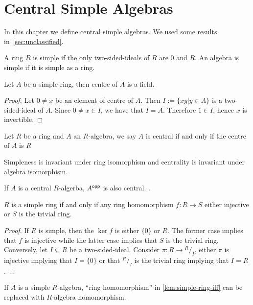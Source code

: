 \chapter{Central Simple Algebras}\label{sec:csa}

In this chapter we define central simple algebras. We used some results
in~\cref{sec:unclassified}.

\begin{definition} A ring $R$ is simple if the only
  two-sided-ideals of $R$ are ${0}$ and $R$. An algebra is simple if it is
  simple as a ring. \leanok {}
\end{definition}

\begin{lemma}
  \label{lem:center-simple-ring}
  Let $A$ be a simple ring, then centre of $A$ is a field. \leanok
\end{lemma}
\begin{proof}
  Let $0\ne x$ be an element of centre of $A$. Then $I := \{xy | y\in A\}$ is a
  two-sided-ideal of $A$. Since $0\ne x\in I$, we have that $I = A$. Therefore
  $1 \in I$, hence $x$ is invertible.
\end{proof}

\begin{definition}
  Let $R$ be a ring and $A$ an $R$-algebra, we say $A$ is central if and only if
  the centre of $A$ is $R$ \leanok {}
\end{definition}

\begin{remark}
  Simpleness is invariant under ring isomorphism and centrality is invariant
  under algebra isomorphism.
\end{remark}

\begin{lemma}
  \label{lem:opp-central}
  If $A$ is a central $R$-algerba, $A^{\mathsf{opp}}$ is also central.
  \leanok
  .
\end{lemma}

\begin{lemma}\label{lem:simple-ring-iff}
  $R$ is a simple ring if and only if any ring homomorphism $f : R \to S$ either
  injective or $S$ is the trivial ring. \leanok
\end{lemma}
\begin{proof}
  If $R$ is simple, then the $\ker f$ is either $\{0\}$ or $R$. The former case
  implies that $f$ is injective while the latter case implies that $S$ is the
  trivial ring. Conversely, let $I\subseteq R$ be a two-sided-ideal. Consider
  $\pi: R \to {}^{R}/_{I}$, either $\pi$ is injective implying that $I = \{0\}$
  or that ${}^{R}/_{I}$ is the trivial ring implying that $I = R$.
\end{proof}
\begin{remark}
  If $A$ is a simple $R$-algebra, ``ring homomorphism'' in \cref{lem:simple-ring-iff} can be replaced with $R$-algebra homomorphism.
\end{remark}

